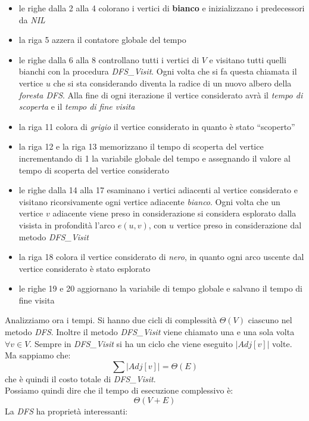 \documentclass[a4paper,12pt, oneside]{book}
\begin{document}
\begin{itemize}
  \item le righe dalla 2 alla 4 colorano i vertici di \textbf{bianco}
  e inizializzano i predecessori da \textit{NIL}
  \item la riga 5 azzera il contatore globale del tempo
  \item le righe dalla 6 alla 8 controllano tutti i vertici di $V$ e
  visitano tutti quelli bianchi con la procedura
  \textit{DFS\_Visit}. Ogni volta che si fa questa chiamata il vertice
  $u$ che si sta considerando diventa la radice di un nuovo albero
  della \textit{foresta DFS}. Alla fine di ogni iterazione il vertice
  considerato avrà il \textit{tempo di scoperta} e il \textit{tempo di
    fine visita}
  \newpage
  \item la riga 11 colora di \textit{grigio} il vertice considerato in
  quanto è stato ``scoperto''
  \item la riga 12 e la riga 13  memorizzano il tempo di scoperta del vertice
  incrementando di 1 la variabile globale del tempo e assegnando il
  valore al tempo di scoperta del vertice considerato
  \item le righe dalla 14 alla 17 esaminano i vertici adiacenti al
  vertice considerato e visitano ricorsivamente ogni vertice adiacente
  \textit{bianco}. Ogni volta che un vertice $v$ adiacente viene preso
  in considerazione si considera esplorato dalla visista in profondità
  l'arco $e(u,v)$, con $u$ vertice preso in considerazione dal metodo
  \textit{DFS\_Visit}
  \item la riga 18 colora il vertice considerato di \textit{nero}, in
  quanto ogni arco uscente dal vertice considerato è stato esplorato
  \item le righe 19 e 20 aggiornano la variabile di tempo globale
  e salvano il tempo di fine visita
\end{itemize}
Analizziamo ora i tempi. Si hanno due cicli di complessità
$\Theta(V)$ ciascuno nel metodo \textit{DFS}. Inoltre il metodo
\textit{DFS\_Visit} viene chiamato una e una sola volta $\forall v\in
V$. Sempre in \textit{DFS\_Visit} si ha un ciclo che viene eseguito
$\vert Adj[v]\vert$ volte. Ma sappiamo che:
\[\sum \vert Adj[v]\vert=\Theta(E)\]
che è quindi il costo totale di \textit{DFS\_Visit}.\\
Possiamo quindi dire che il tempo di esecuzione complessivo è:
\[\Theta(V+E)\]
La \textit{DFS} ha proprietà interessanti:
\end{document}
